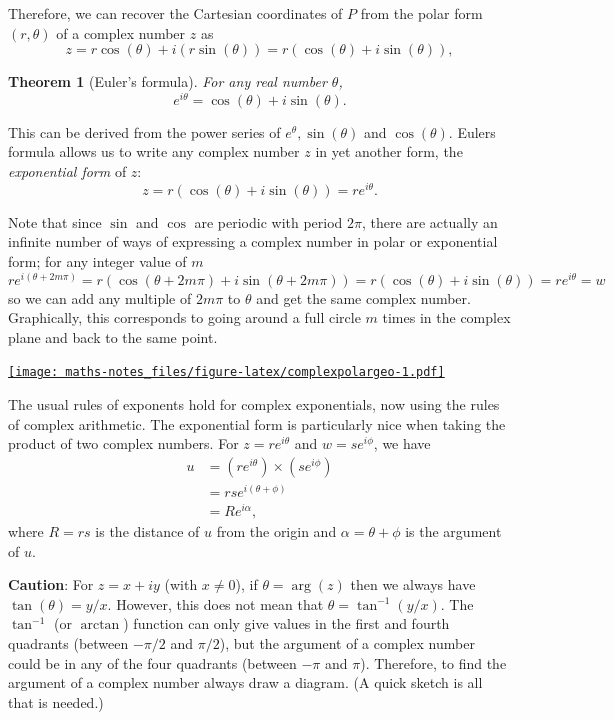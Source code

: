 \documentclass[
]{book}
\newtheorem{theorem}{Theorem}[chapter]
\theoremstyle{definition}
\theoremstyle{definition}
\theoremstyle{definition}
\theoremstyle{definition}
\theoremstyle{remark}
\begin{document}
Therefore, we can recover the Cartesian coordinates of \(P\) from the polar form \((r, \theta)\) of a complex number \(z\) as
\[
z = r \cos(\theta) + i (r \sin(\theta)) = r (\cos(\theta) + i \sin(\theta)),
\]

\begin{theorem}[Euler's formula]
\protect\hypertarget{thm:euler}{}\label{thm:euler}For any real number \(\theta\),
\[
e^{i\theta}=\cos (\theta) + i \sin(\theta).
\]
\end{theorem}

This can be derived from the power series of \(e^\theta, \sin(\theta)\) and \(\cos(\theta)\). Eulers formula allows us to write any complex number \(z\) in yet another form, the \emph{exponential form} of \(z\):
\[
z = r (\cos (\theta) + i \sin (\theta)) = re^{i\theta}.
\]

Note that since \(\sin\) and \(\cos\) are periodic with period \(2\pi\), there are actually an infinite number of ways of expressing a complex number in polar or exponential form; for any integer value of \(m\)
\[re^{i(\theta+2m\pi)}=r(\cos(\theta+2m\pi)+i\sin(\theta+2m\pi))=r(\cos(\theta)+i\sin(\theta))=re^{i\theta}=w\]
so we can add any multiple of \(2m\pi\) to \(\theta\) and get the same complex number. Graphically, this corresponds to going around a full circle \(m\) times in the complex plane and back to the same point.

\href{https://www.geogebra.org/calculator/mvgafsek}{\texttt{[image: maths-notes\_files/figure-latex/complexpolargeo-1.pdf]}}

The usual rules of exponents hold for complex exponentials, now using the rules of complex arithmetic. The exponential form is particularly nice when taking the product of two complex numbers. For \(z = re^{i\theta}\) and \(w = se^{i\phi}\), we have
\begin{align*}
u &= (re^{i\theta}) \times (se^{i\phi})\\
&= rs e^{i(\theta + \phi)} \\
&= R e^{i\alpha},
\end{align*}
where \(R = rs\) is the distance of \(u\) from the origin and \(\alpha = \theta + \phi\) is the argument of \(u\).

\textbf{Caution}: For \(z = x + iy\) (with \(x \neq 0\)), if \(\theta = \arg(z)\) then we always have \(\tan (\theta) = y/x\). However, this does not mean that \(\theta = \tan^{-1}(y/x)\). The \(\tan^{-1}\) (or \(\arctan\)) function can only give values in the first and fourth quadrants (between \(-\pi/2\) and \(\pi/2\)), but the argument of a complex number could be in any of the four quadrants (between \(-\pi\) and \(\pi\)). Therefore, to find the argument of a complex number always draw a diagram. (A quick sketch is all that is needed.)
\end{document}
